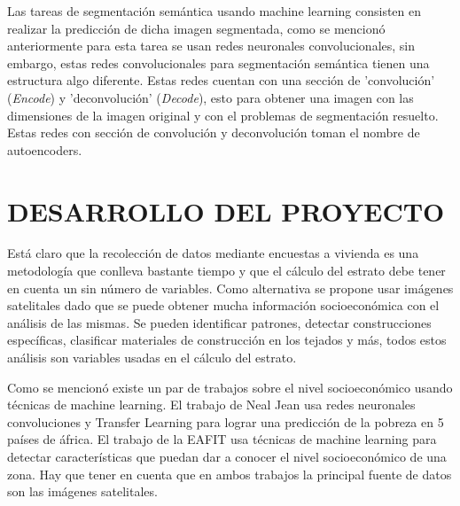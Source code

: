 
Las tareas de segmentación semántica usando machine learning consisten en realizar la predicción de dicha imagen segmentada, como se mencionó anteriormente para esta tarea se usan redes neuronales convolucionales, sin embargo, estas redes convolucionales para segmentación semántica tienen una estructura algo diferente. Estas redes cuentan con una sección de 'convolución' (\textit{Encode}) y 'deconvolución' (\textit{Decode}), esto para obtener una imagen con las dimensiones de la imagen original y con el problemas de segmentación resuelto. Estas redes con sección de convolución y deconvolución toman el nombre de autoencoders. 


 
\newpage\chapter{DESARROLLO DEL PROYECTO} 

Está claro que la recolección de datos mediante encuestas a vivienda es una metodología que conlleva bastante tiempo y que el cálculo del estrato debe tener en cuenta un sin número de variables. Como alternativa se propone usar imágenes satelitales dado que se puede obtener mucha información socioeconómica con el análisis de las mismas. Se pueden identificar patrones, detectar construcciones específicas, clasificar materiales de construcción en los tejados y más, todos estos análisis son variables usadas en el cálculo del estrato.
  
Como se mencionó existe un par de trabajos sobre el nivel socioeconómico usando técnicas de machine learning. El trabajo de Neal Jean usa redes neuronales convoluciones y Transfer Learning para lograr una predicción de la pobreza en 5 países de áfrica. El trabajo de la EAFIT usa técnicas de machine learning para detectar características que puedan dar a conocer el nivel socioeconómico de una zona. Hay que tener en cuenta que en ambos trabajos la principal fuente de datos son las imágenes satelitales.
 
